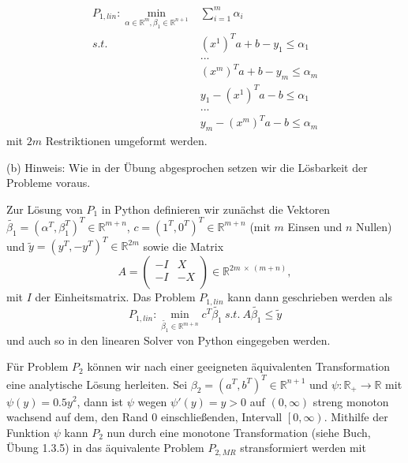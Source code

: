 \documentclass[ngerman, a4paper,12pt]{article}
\begin{document}
\begin{equation*}
	\begin{split}
	P_{1, lin}: \min_{\alpha \in \mathbb{R}^m, \beta_1 \in \mathbb{R}^{n+1}} & \sum_{i=1}^{m} \alpha_i \\
	s.t. \ &(x^1)^Ta + b -y_1 \leq \alpha_1 \\
	& ... \\
	& (x^m)^Ta + b -y_m \leq \alpha_m \\
	& y_1 - (x^1)^Ta - b \leq \alpha_1 \\
	& ... \\
	& y_m - (x^m)^Ta - b \leq \alpha_m 
	\end{split}
\end{equation*}
mit $2m$ Restriktionen umgeformt werden. \par
(b) Hinweis: Wie in der Übung abgesprochen setzen wir die Lösbarkeit der Probleme voraus.\par Zur Lösung von $P_1$ in Python definieren wir zunächst die Vektoren $\tilde{\beta_1} = (\alpha^T, \beta_1^T)^T \in \mathbb{R}^{m+n}$, $c = (1^T, 0^T)^T \in \mathbb{R}^{m+n}$ (mit $m$ Einsen und $n$ Nullen) und $\tilde{y}= (y^T, -y^T)^T \in \mathbb{R}^{2m}$ sowie die Matrix
\begin{equation*}
	A = \begin{pmatrix}
					-I &X \\
					-I & -X \\
					\end{pmatrix} \in \mathbb{R}^{2m \ \times \ (m+n)},
\end{equation*}
mit $I$ der Einheitsmatrix. Das Problem $P_{1, lin}$ kann dann geschrieben werden als
\begin{equation*}
	P_{1, lin}: \min_{\tilde{\beta_1} \in \mathbb{R}^{m+n} } c^T \tilde{\beta_1} \ s.t. \ A \tilde{\beta_1} \leq \tilde{y}
\end{equation*}
und auch so in den linearen Solver von Python eingegeben werden. \par
Für Problem $P_2$ können wir nach einer geeigneten äquivalenten Transformation eine analytische Lösung herleiten. Sei $\beta_2 = (a^T, b^T)^T \in \mathbb{R}^{n+1}$ und $\psi: \mathbb{R}_+ \rightarrow \mathbb{R}$ mit $\psi(y)=0.5y^2$, dann ist $\psi$ wegen $\psi'(y)=y > 0$ auf $(0, \infty)$ streng monoton wachsend auf dem, den Rand $0$ einschließenden, Intervall $\left[0, \infty \right)$. Mithilfe der Funktion $\psi$ kann $P_2$ nun durch eine monotone Transformation (siehe Buch, Übung 1.3.5) in das äquivalente Problem $P_{2, MR}$ stransformiert werden mit
\end{document}
